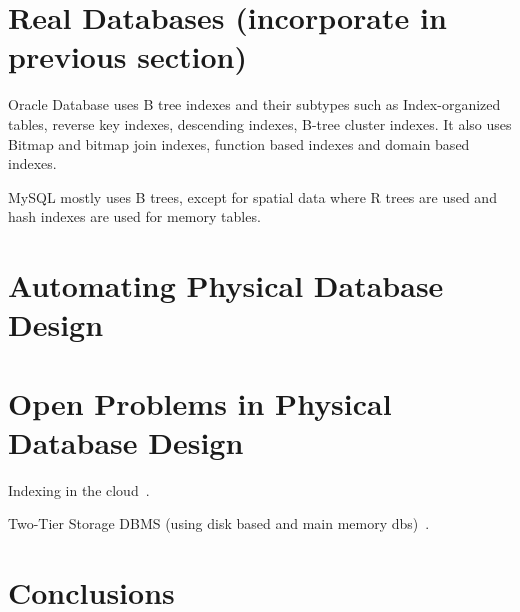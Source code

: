 \documentclass[12pt,a4paper]{article}
\begin{document}
\section{Real Databases (incorporate in previous section)}

Oracle Database uses B tree indexes and their subtypes such as Index-organized tables, reverse key indexes, descending indexes, B-tree cluster indexes. It also
uses Bitmap and bitmap join indexes, function based indexes and domain based indexes.


MySQL mostly uses B trees, except for spatial data where R trees are used and hash indexes are used for memory tables.

\section{Automating Physical Database Design}
\label{SEC-AUTO}

\section{Open Problems in Physical Database Design}
\label{SEC-OPEN}

Indexing in the cloud~\cite{wang2010indexing}.

Two-Tier Storage DBMS (using disk based and main memory dbs)~\cite{eo2008two}.

\section{Conclusions}
\label{SEC-CONCL}

%








\end{document}
